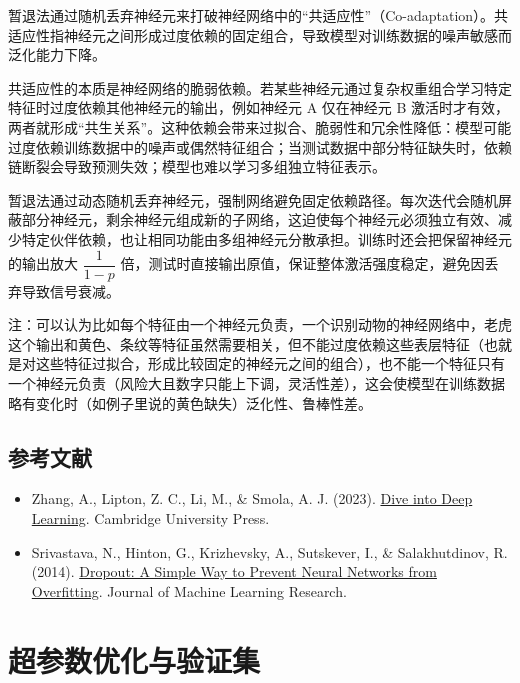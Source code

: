 暂退法通过随机丢弃神经元来打破神经网络中的``共适应性''（Co-adaptation）。共适应性指神经元之间形成过度依赖的固定组合，导致模型对训练数据的噪声敏感而泛化能力下降。

共适应性的本质是神经网络的脆弱依赖。若某些神经元通过复杂权重组合学习特定特征时过度依赖其他神经元的输出，例如神经元 A 仅在神经元 B 激活时才有效，两者就形成``共生关系''。这种依赖会带来过拟合、脆弱性和冗余性降低：模型可能过度依赖训练数据中的噪声或偶然特征组合；当测试数据中部分特征缺失时，依赖链断裂会导致预测失效；模型也难以学习多组独立特征表示。

暂退法通过动态随机丢弃神经元，强制网络避免固定依赖路径。每次迭代会随机屏蔽部分神经元，剩余神经元组成新的子网络，这迫使每个神经元必须独立有效、减少特定伙伴依赖，也让相同功能由多组神经元分散承担。训练时还会把保留神经元的输出放大 \(\dfrac{1}{1-p}\) 倍，测试时直接输出原值，保证整体激活强度稳定，避免因丢弃导致信号衰减。

注：可以认为比如每个特征由一个神经元负责，一个识别动物的神经网络中，老虎这个输出和黄色、条纹等特征虽然需要相关，但不能过度依赖这些表层特征（也就是对这些特征过拟合，形成比较固定的神经元之间的组合），也不能一个特征只有一个神经元负责（风险大且数字只能上下调，灵活性差），这会使模型在训练数据略有变化时（如例子里说的黄色缺失）泛化性、鲁棒性差。

\hypertarget{ux53c2ux8003ux6587ux732e-6}{%
\subsection{参考文献}\label{ux53c2ux8003ux6587ux732e-6}}

\vspace{0.25em}
\begin{itemize}
\tightlist
\item
  Zhang, A., Lipton, Z. C., Li, M., \& Smola, A. J. (2023). \href{https://D2L.ai}{Dive into Deep Learning}. Cambridge University Press.
\item
  Srivastava, N., Hinton, G., Krizhevsky, A., Sutskever, I., \& Salakhutdinov, R. (2014). \href{https://jmlr.org/papers/v15/srivastava14a.html}{Dropout: A Simple Way to Prevent Neural Networks from Overfitting}. Journal of Machine Learning Research.
\end{itemize}

\clearpage

\hypertarget{ux8d85ux53c2ux6570ux4f18ux5316ux4e0eux9a8cux8bc1ux96c6}{%
\section{超参数优化与验证集}\label{ux8d85ux53c2ux6570ux4f18ux5316ux4e0eux9a8cux8bc1ux96c6}}

